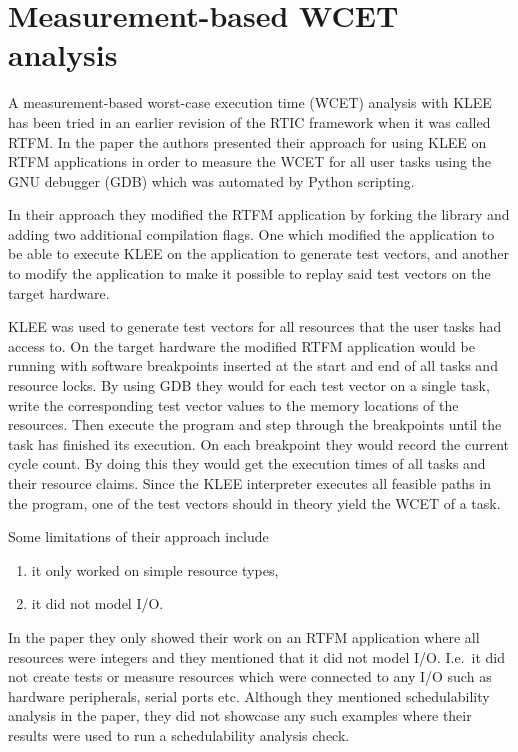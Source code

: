 \section{Measurement-based WCET analysis}
A measurement-based worst-case execution time (WCET) analysis with KLEE has
been tried in an earlier revision of the RTIC framework when it was called
RTFM\cite{lindner}. In the paper the authors presented their approach for using
KLEE on RTFM applications in order to measure the WCET for all user tasks
using the GNU debugger (GDB) which was automated by Python scripting.

In their approach they modified the RTFM application by forking the library and
adding two additional compilation flags. One which modified the application to be
able to execute KLEE on the application to generate test vectors, and another
to modify the application to make it possible to replay said test vectors on
the target hardware.

KLEE was used to generate test vectors for all resources that the user tasks
had access to. On the target hardware the modified RTFM application would be
running with software breakpoints inserted at the start and end of all tasks
and resource locks. By using GDB they would for each test vector on a single
task, write the corresponding test vector values to the memory locations of the
resources. Then execute the program and step through the breakpoints until the
task has finished its execution. On each breakpoint they would record the
current cycle count. By doing this they would get the execution times of all
tasks and their resource claims. Since the KLEE interpreter executes all
feasible paths in the program, one of the test vectors should in theory yield
the WCET of a task.

Some limitations of their approach include
\begin{enumerate}
    \item it only worked on simple resource types,
    \item it did not model I/O.
\end{enumerate}
In the paper they only showed their work on an RTFM application where all
resources were integers and they mentioned that it did not model I/O. I.e.\
it did not create tests or measure resources which were connected to any I/O
such as hardware peripherals, serial ports etc. Although they mentioned
schedulability analysis in the paper, they did not showcase any such examples
where their results were used to run a schedulability analysis check.

